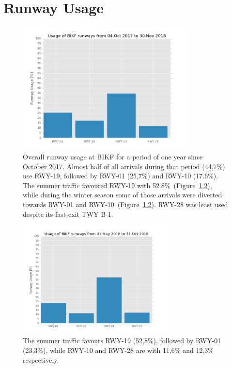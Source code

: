 


\chapter{Runway Usage}\label{cha:RWY_usage}


\begin{figure}[h]
    \centering
    \includegraphics[width=0.8\textwidth]{graphics/fig_runway_usage_2017-10-04_to_2018-11-30.png}
    \caption[Runway usage at BIKF]{Overall runway usage at BIKF for a period of one year since October 2017. Almost half of all arrivals during that period (44,7\%) use RWY-19, followed by RWY-01 (25,7\%) and RWY-10 (17.6\%). The summer traffic favoured RWY-19 with 52.8\%~(Figure~\ref{fig:runway_usage_summer}), while during the winter season some of those arrivals were diverted towards RWY-01 and RWY-10~(Figure~\ref{fig:runway_usage_summer}). RWY-28 was least used despite its fast-exit TWY B-1.}
    \label{fig:runway_usage}
\end{figure}

\begin{figure}[h]
    \centering
    \includegraphics[width=0.7\textwidth]{graphics/fig_runway_usage_summer}
    \caption[Summer runway usage at BIKF]{The summer traffic favours RWY-19 (52,8\%), followed by RWY-01 (23,3\%), while RWY-10 and RWY-28 are with 11,6\% and 12,3\% respectively.}
    \label{fig:runway_usage_summer}
\end{figure}


